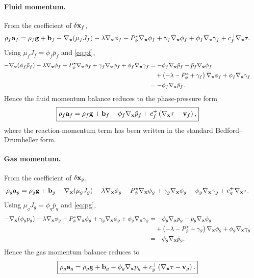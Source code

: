 \paragraph{Fluid momentum.}  From the coefficient of $\delta\mathbf{x}_f$,
\begin{equation}
  \rho_f\mathbf{a}_f = \rho_f\mathbf{g} + \mathbf{b}_f - \nabla_{\mathbf{x}}(\mu_f J_f) - \lambda\nabla_{\mathbf{x}}\phi_f - P^\star_\phi\nabla_{\mathbf{x}}\phi_f + \gamma_f\nabla_{\mathbf{x}}\phi_f + \phi_f\nabla_{\mathbf{x}}\gamma_f + c^+_f\nabla_{\mathbf{x}}\tau.
  \label{eq:mom_fluid_raw}
\end{equation}
Using $\mu_f J_f = \phi_f \bar p_f$ and \eqref{eq:pf},
\begin{align*}
  -\nabla_{\mathbf{x}}(\phi_f \bar p_f) - \lambda\nabla_{\mathbf{x}}\phi_f - P^\star_\phi\nabla_{\mathbf{x}}\phi_f + \gamma_f\nabla_{\mathbf{x}}\phi_f + \phi_f\nabla_{\mathbf{x}}\gamma_f
  &= -\phi_f\nabla_{\mathbf{x}}\bar p_f - \bar p_f\nabla_{\mathbf{x}}\phi_f \\
  &\quad + \left(-\lambda - P^\star_\phi + \gamma_f\right)\nabla_{\mathbf{x}}\phi_f
  + \phi_f\nabla_{\mathbf{x}}\gamma_f \\
  &= -\phi_f\nabla_{\mathbf{x}}\bar p_f.
\end{align*}
Hence the fluid momentum balance reduces to the phase-pressure form
\begin{equation}
  \boxed{\rho_f\mathbf{a}_f = \rho_f\mathbf{g} + \mathbf{b}_f - \phi_f\nabla_{\mathbf{x}}\bar p_f + c^+_f\left(\nabla_{\mathbf{x}}\tau - \mathbf{v}_f\right),}
  \label{eq:mom_fluid}
\end{equation}
where the reaction-momentum term has been written in the standard Bedford--Drumheller form.

\paragraph{Gas momentum.}  From the coefficient of $\delta\mathbf{x}_g$,
\begin{equation}
  \rho_g\mathbf{a}_g = \rho_g\mathbf{g} + \mathbf{b}_g - \nabla_{\mathbf{x}}(\mu_g J_g) - \lambda\nabla_{\mathbf{x}}\phi_g - P^\star_\phi\nabla_{\mathbf{x}}\phi_g + \gamma_g\nabla_{\mathbf{x}}\phi_g + \phi_g\nabla_{\mathbf{x}}\gamma_g + c^+_g\nabla_{\mathbf{x}}\tau.
  \label{eq:mom_gas_raw}
\end{equation}
Using $\mu_g J_g = \phi_g \bar p_g$ and \eqref{eq:pg},
\begin{align*}
  -\nabla_{\mathbf{x}}(\phi_g \bar p_g) - \lambda\nabla_{\mathbf{x}}\phi_g - P^\star_\phi\nabla_{\mathbf{x}}\phi_g + \gamma_g\nabla_{\mathbf{x}}\phi_g + \phi_g\nabla_{\mathbf{x}}\gamma_g
  &= -\phi_g\nabla_{\mathbf{x}}\bar p_g - \bar p_g\nabla_{\mathbf{x}}\phi_g \\
  &\quad + \left(-\lambda - P^\star_\phi + \gamma_g\right)\nabla_{\mathbf{x}}\phi_g
  + \phi_g\nabla_{\mathbf{x}}\gamma_g \\
  &= -\phi_g\nabla_{\mathbf{x}}\bar p_g.
\end{align*}
Hence the gas momentum balance reduces to
\begin{equation}
  \boxed{\rho_g\mathbf{a}_g = \rho_g\mathbf{g} + \mathbf{b}_g - \phi_g\nabla_{\mathbf{x}}\bar p_g + c^+_g\left(\nabla_{\mathbf{x}}\tau - \mathbf{v}_g\right).}
  \label{eq:mom_gas}
\end{equation}

